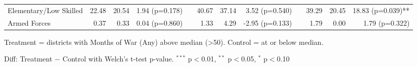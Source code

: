 \begin{table}[htbp]
\begin{tabular}{l rrr c rrr c rrr}
\quad Elementary/Low Skilled & 22.48 & 20.54 & 1.94 (p=0.178) &  & 40.67 & 37.14 & 3.52 (p=0.540) &  & 39.29 & 20.45 & 18.83 (p=0.039)** \\
\quad Armed Forces & 0.37 & 0.33 & 0.04 (p=0.860) &  & 1.33 & 4.29 & -2.95 (p=0.133) &  & 1.79 & 0.00 & 1.79 (p=0.322) \\
\bottomrule
\end{tabular}
\begin{tablenotes}
\small
\item Treatment = districts with Months of War (Any) above median (>50). Control = at or below median.
\item Diff: Treatment $-$ Control with Welch's t-test p-value. $^{{***}}$ p$<$0.01, $^{{**}}$ p$<$0.05, $^{{*}}$ p$<$0.10
\end{tablenotes}
\end{table}